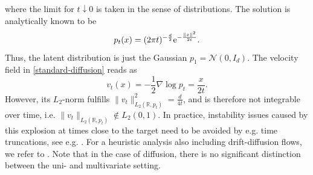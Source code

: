 \documentclass{article}
\newcommand{\R}{\mathbb{R}}
\theoremstyle{plain}
\theoremstyle{definition}
\theoremstyle{remark}
\begin{document}
where the limit for $t \downarrow 0$ is taken in the sense of distributions.
The solution is analytically known to be
\begin{equation}\label{diff-density}
    p_t(x) = (2 \pi t)^{-\frac{d}{2}} {\rm e}^{-\frac{\|x\|^2}{2 t}}.
\end{equation}
Thus, the latent distribution is just the Gaussian $p_1 = \mathcal{N}(0,I_d)$.
The velocity field in \eqref{standard-diffusion} reads as 
\begin{equation}\label{diff-velo}
    v_t(x) = -\frac{1}{2} \nabla \log p_t = \frac{x}{2t}.
\end{equation}
However, its $L_2$-norm fulfills
$\|{v}_{t}\|_{L_2(\R, p_t)}^2 =  \frac{d}  {4t}$,
and is therefore not integrable over time, i.e. $\|{v}_{t}\|_{L_2(\R, p_t)} \notin L_2(0,1)$. In practice, instability issues caused by this explosion at times close to the target need to be avoided by e.g. time truncations, see e.g. \cite{soft2021}.
For a heuristic analysis also including drift-diffusion flows, we refer to \cite{P2022}.
 Note that in the case of diffusion, there is no significant distinction between the uni- and multivariate setting. 
\end{document}
